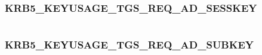 \documentclass[letterpaper,10pt,english]{sphinxmanual}
\begin{document}
\begin{fulllineitems}
\label{appdev/refs/macros/KRB5_KEYUSAGE_TGS_REP_ENCPART_SUBKEY:KRB5_KEYUSAGE_TGS_REP_ENCPART_SUBKEY}
\end{fulllineitems}


\begin{tabulary}{\linewidth}{|L|L|}
\hline

 & 
\\
\hline\end{tabulary}



\subsubsection{KRB5\_KEYUSAGE\_TGS\_REQ\_AD\_SESSKEY}
\label{appdev/refs/macros/KRB5_KEYUSAGE_TGS_REQ_AD_SESSKEY::doc}\label{appdev/refs/macros/KRB5_KEYUSAGE_TGS_REQ_AD_SESSKEY:krb5-keyusage-tgs-req-ad-sesskey}\label{appdev/refs/macros/KRB5_KEYUSAGE_TGS_REQ_AD_SESSKEY:krb5-keyusage-tgs-req-ad-sesskey-data}

\begin{fulllineitems}
\label{appdev/refs/macros/KRB5_KEYUSAGE_TGS_REQ_AD_SESSKEY:KRB5_KEYUSAGE_TGS_REQ_AD_SESSKEY}
\end{fulllineitems}


\begin{tabulary}{\linewidth}{|L|L|}
\hline

 & 
\\
\hline\end{tabulary}



\subsubsection{KRB5\_KEYUSAGE\_TGS\_REQ\_AD\_SUBKEY}
\label{appdev/refs/macros/KRB5_KEYUSAGE_TGS_REQ_AD_SUBKEY:krb5-keyusage-tgs-req-ad-subkey}\label{appdev/refs/macros/KRB5_KEYUSAGE_TGS_REQ_AD_SUBKEY::doc}\label{appdev/refs/macros/KRB5_KEYUSAGE_TGS_REQ_AD_SUBKEY:krb5-keyusage-tgs-req-ad-subkey-data}

\begin{fulllineitems}
\label{appdev/refs/macros/KRB5_KEYUSAGE_TGS_REQ_AD_SUBKEY:KRB5_KEYUSAGE_TGS_REQ_AD_SUBKEY}
\end{fulllineitems}
\end{document}
